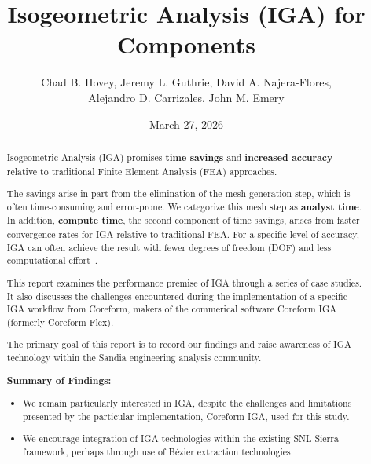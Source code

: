 \documentclass[12pt,report,justified]{SANDreport}
\title{Isogeometric Analysis (IGA) for Components}
\author{Chad B. Hovey, Jeremy L. Guthrie, David A. Najera-Flores, \\ Alejandro D. Carrizales, John M. Emery}
\date{March 27, 2026}
\begin{document}
    \maketitle

%
\begin{abstract}
Isogeometric Analysis (IGA) promises {\bf time savings} and {\bf increased accuracy} relative to traditional Finite Element Analysis (FEA) approaches.  

The savings arise in part from the elimination of the mesh generation step, which is often time-consuming and error-prone.  We categorize this mesh step as {\bf analyst time}.  In addition, {\bf compute time}, the second component of time savings, arises from faster convergence rates for IGA relative to traditional FEA.  For a specific level of accuracy, IGA can often achieve the result with fewer degrees of freedom (DOF) and less computational effort~\cite{Hughes2005Isogeometric, Hughes2022NCSU}.

This report examines the performance premise of IGA through a series of case studies.  
It also discusses the challenges encountered during the implementation of a specific IGA workflow from Coreform, makers of the commerical software Coreform IGA (formerly Coreform Flex).

The primary goal of this report is to record our findings and raise awareness of IGA technology within the Sandia engineering analysis community.

{\bf Summary of Findings:}
\begin{itemize}
\item We remain particularly interested in IGA, despite the challenges and limitations presented by the particular implementation, Coreform IGA, used for this study.
\item We encourage integration of IGA technologies within the existing SNL Sierra framework, perhaps through use of B{\'e}zier extraction technologies.
\end{itemize}

\end{abstract}

%
\tableofcontents
\listoffigures
\listoftables
\end{document}
